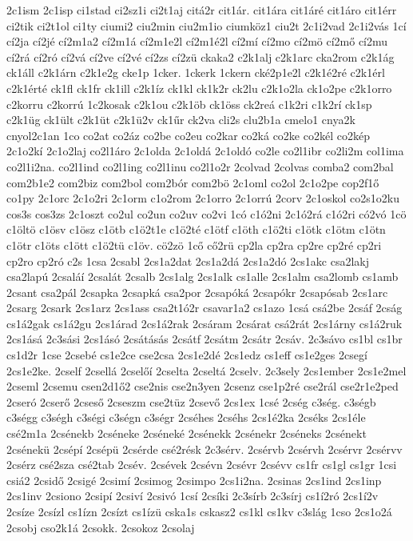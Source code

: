 {2c1ism
2c1isp
ci1stad
ci2sz1i
ci2t1aj
citá2r
cit1ár.
cit1ára
cit1áré
cit1áro
cit1érr
ci2tik
ci2t1ol
ci1ty
ciumi2
ciu2min
ciu2m1io
ciumköz1
ciu2t
2c1i2vad
2c1i2vás
1cí
cí2ja
cí2jé
cí2m1a2
cí2m1á
cí2m1e2l
cí2m1é2l
cí2mí
cí2mo
cí2mö
cí2mő
cí2mu
cí2rá
cí2ró
cí2vá
cí2ve
cí2vé
cí2zs
cí2zü
ckaka2
c2k1alj
c2k1arc
cka2rom
c2k1ág
ck1áll
c2k1árn
c2k1e2g
cke1p
1cker.
1ckerk
1ckern
cké2p1e2l
c2k1é2ré
c2k1érl
c2k1érté
ck1fl
ck1fr
ck1ill
c2k1íz
ck1kl
ck1k2r
ck2lu
c2k1o2la
ck1o2pe
c2k1orro
c2korru
c2korrú
1c2kosak
c2k1ou
c2k1öb
ck1öss
ck2reá
c1k2ri
c1k2rí
ck1sp
c2k1üg
ck1ült
c2k1üt
c2k1ü2v
ck1űr
ck2va
cli2s
clu2b1a
cmelo1
cnya2k
cnyol2c1an
1co
co2at
co2áz
co2be
co2eu
co2kar
co2ká
co2ke
co2kél
co2kép
2c1o2kí
2c1o2laj
co2l1áro
2c1olda
2c1oldá
2c1oldó
co2le
co2l1ibr
co2li2m
col1ima
co2l1i2na.
co2l1ind
co2l1ing
co2l1inu
co2l1o2r
2colvad
2colvas
comba2
com2bal
com2b1e2
com2biz
com2bol
com2bór
com2bö
2c1oml
co2ol
2c1o2pe
cop2f1ő
co1py
2c1orc
2c1o2ri
2c1orm
c1o2rom
2c1orro
2c1orrú
2corv
2c1oskol
co2s1o2ku
cos3s
cos3zs
2c1oszt
co2ul
co2un
co2uv
co2vi
1có
c1ó2ni
2c1ó2rá
c1ó2ri
có2vó
1cö
c1öltö
c1ösv
c1ösz
c1ötb
c1ö2t1e
c1ö2té
c1ötf
c1öth
c1ö2ti
c1ötk
c1ötm
c1ötn
c1ötr
c1öts
c1ött
c1ö2tü
c1öv.
cö2zö
1cő
cő2rü
cp2la
cp2ra
cp2re
cp2ré
cp2ri
cp2ro
cp2ró
c2s
1csa
2csabl
2cs1a2dat
2cs1a2dá
2cs1a2dó
2cs1akc
csa2lakj
csa2lapú
2csaláí
2csalát
2csalb
2cs1alg
2cs1alk
cs1alle
2cs1alm
csa2lomb
cs1amb
2csant
csa2pál
2csapka
2csapká
csa2por
2csapóká
2csapókr
2csapósab
2cs1arc
2csarg
2csark
2cs1arz
2cs1ass
csa2t1ó2r
csavar1a2
cs1azo
1csá
csá2be
2csáf
2cság
cs1á2gak
cs1á2gu
2cs1árad
2cs1á2rak
2csáram
2csárat
csá2rát
2cs1árny
cs1á2ruk
2cs1ásá
2c3sási
2cs1ásó
2csátásás
2csátf
2csátm
2csátr
2csáv.
2c3sávo
cs1bl
cs1br
cs1d2r
1cse
2csebé
cs1e2ce
cse2csa
2cs1e2dé
2cs1edz
cs1eff
cs1e2ges
2csegí
2cs1e2ke.
2cself
2csellá
2cselőí
2cselta
2cseltá
2cselv.
2c3sely
2cs1ember
2cs1e2mel
2cseml
2csemu
csen2d1ő2
cse2nis
cse2n3yen
2csenz
cse1p2ré
cse2rál
cse2r1e2ped
2cseró
2cserő
2cseső
2cseszm
cse2tüz
2csevő
2cs1ex
1csé
2cség
c3ség.
c3ségb
c3ségg
c3ségh
c3ségi
c3ségn
c3ségr
2cséhes
2cséhs
2cs1é2ka
2cséks
2cs1éle
csé2m1a
2csénekb
2cséneke
2cséneké
2csénekk
2csénekr
2cséneks
2csénekt
2csénekü
2csépí
2csépü
2csérde
csé2résk
2c3sérv.
2csérvb
2csérvh
2csérvr
2csérvv
2csérz
csé2sza
csé2tab
2csév.
2csévek
2csévn
2csévr
2csévv
cs1fr
cs1gl
cs1gr
1csi
csiá2
2csidő
2csigé
2csimí
2csimog
2csimpo
2cs1i2na.
2csinas
2cs1ind
2cs1inp
2cs1inv
2csiono
2csipí
2csiví
2csivó
1csí
2csíki
2c3sírb
2c3sírj
cs1í2ró
2cs1í2v
2csíze
2csízl
cs1ízn
2csízt
cs1ízü
cska1s
cskasz2
cs1kl
cs1kv
c3slág
1cso
2cs1o2á
2csobj
cso2k1á
2csokk.
2csokoz
2csolaj
}
